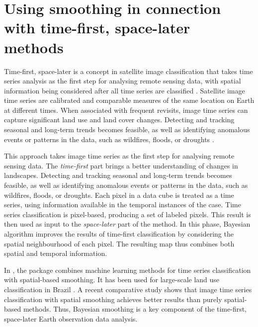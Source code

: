 \documentclass[
  shortnames]{jss}
\begin{document}
\hypertarget{using-smoothing-in-connection-with-time-first-space-later-methods}{%
\section{Using smoothing in connection with time-first, space-later methods}\label{using-smoothing-in-connection-with-time-first-space-later-methods}}

Time-first, space-later is a concept in satellite image classification that takes time series analysis as the first step for analysing remote sensing data, with spatial information being considered after all time series are classified \citep{Camara2016}. Satellite image time series are calibrated and comparable measures of the same location on Earth at different times. When associated with frequent revisits, image time series can capture significant land use and land cover changes. Detecting and tracking seasonal and long-term trends becomes feasible, as well as identifying anomalous events or patterns in the data, such as wildfires, floods, or droughts \cite{Woodcock2020}.

This approach takes image time series as the first step for analysing remote sensing data. The \textit{time-first} part brings a better understanding of changes in landscapes. Detecting and tracking seasonal and long-term trends becomes feasible, as well as identifying anomalous events or patterns in the data, such as wildfires, floods, or droughts. Each pixel in a data cube is treated as a time series, using information available in the temporal instances of the case. Time series classification is pixel-based, producing a set of labeled pixels. This result is then used as input to the \textit{space-later} part of the method. In this phase, Bayesian algorithm improves the results of time-first classification by considering the spatial neighbourhood of each pixel. The resulting map thus combines both spatial and temporal information.

In , the  package combines machine learning methods for time series classification with spatial-based smoothing\citep{Simoes2021}. It has been used for large-scale land use classification in Brazil \cite{Picoli2018}. A recent comparative study shows that image time series classification with spatial smoothing achieves better results than purely spatial-based methods\citep{Hadi2023}. Thus, Bayesian smoothing is a key component of the time-first, space-later Earth observation data analysis.
\end{document}
